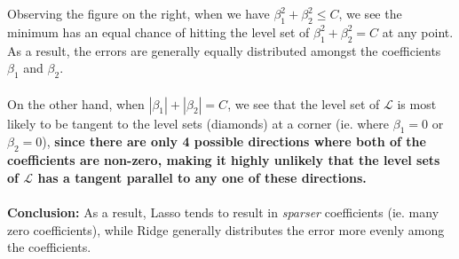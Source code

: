 \documentclass[paper=a4, fontsize=11pt]{scrartcl} %
\numberwithin{equation}{section} %
\numberwithin{figure}{section} %
\numberwithin{table}{section} %
\begin{document}
Observing the figure on the right, when we have $\beta_1^2 + \beta_2^2 \leq C$, we see the minimum has an equal chance of hitting the level set of $\beta_1^2 + \beta_2^2 = C$ at any point. As a result,
the errors are generally equally distributed amongst the coefficients $\beta_1$ and $\beta_2$.\\\\

On the other hand, when $|\beta_1| + |\beta_2| = C$, we see that the level set of $\mathcal{L}$ is most likely to be tangent to the level sets (diamonds) at a corner  (ie. where $\beta_1=0$ or $\beta_2=0$),
\textbf{since there are only 4 possible directions where both of the coefficients are non-zero, making it highly unlikely that the level sets of $\mathcal{L}$ has a tangent parallel to any one of these directions. }\\\\


\textbf{Conclusion:} As a result, Lasso tends to result in \emph{sparser} coefficients (ie. many zero coefficients), while Ridge generally distributes the error more evenly among the coefficients. 
\end{document}
